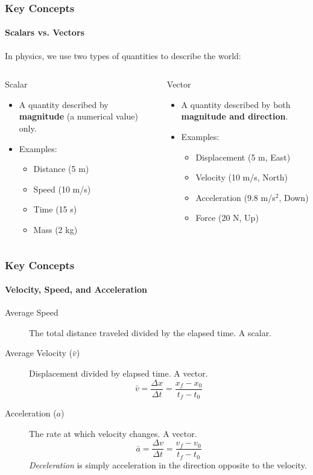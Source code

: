 \documentclass{beamer}
\begin{document}
\begin{frame}
\frametitle{Key Concepts}
\framesubtitle{Scalars vs. Vectors}
In physics, we use two types of quantities to describe the world:
\begin{columns}[T]
    \begin{column}{0.5\textwidth}
        \alert{Scalar}
        \begin{itemize}
            \item A quantity described by \textbf{magnitude} (a numerical value) only.
            \item Examples:
            \begin{itemize}
                \item Distance (5 m)
                \item Speed (10 m/s)
                \item Time (15 s)
                \item Mass (2 kg)
            \end{itemize}
        \end{itemize}
    \end{column}
    \begin{column}{0.5\textwidth}
        \alert{Vector}
        \begin{itemize}
            \item A quantity described by both \textbf{magnitude and direction}.
            \item Examples:
            \begin{itemize}
                \item Displacement (5 m, East)
                \item Velocity (10 m/s, North)
                \item Acceleration (9.8 m/s$^2$, Down)
                \item Force (20 N, Up)
            \end{itemize}
        \end{itemize}
    \end{column}
\end{columns}
\end{frame}

\begin{frame}
\frametitle{Key Concepts}
\framesubtitle{Velocity, Speed, and Acceleration}
\begin{description}
    \item[Average Speed] The total distance traveled divided by the elapsed time. A scalar.
    \pause
    \item[Average Velocity ($\bar{v}$)] Displacement divided by elapsed time. A vector.
    \[ \bar{v} = \frac{\Delta x}{\Delta t} = \frac{x_f - x_0}{t_f - t_0} \]
    \pause
    \item[Acceleration ($a$)] The rate at which velocity changes. A vector.
    \[ \bar{a} = \frac{\Delta v}{\Delta t} = \frac{v_f - v_0}{t_f - t_0} \]
    \textit{Deceleration} is simply acceleration in the direction opposite to the velocity.
\end{description}
\end{frame}
\end{document}
